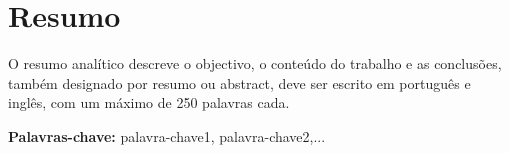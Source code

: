 \chapter*{Resumo}


O resumo analítico descreve o objectivo, o conteúdo do trabalho e as conclusões, também designado por resumo ou abstract, deve ser escrito em português e inglês, com um máximo de 250 palavras cada.

\vspace{1cm}

\textbf{\Large Palavras-chave:} palavra-chave1, palavra-chave2,...

\cleardoublepage

